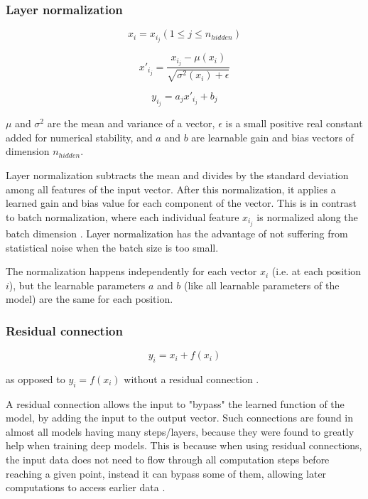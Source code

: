 \subsubsection{Layer normalization}
\label{gpt2:layernorm}


$$x_i = x_{i_j} (1 \leq j \leq n_{hidden})$$

$$x'_{i_j} = \frac {x_{i_j} - \mu(x_i)} {\sqrt {\sigma^2(x_i)+\epsilon}} $$

$$y_{i_j} = a_j x'_{i_j} + b_j$$

$\mu$ and $\sigma^2$ are the mean and variance of a vector, $\epsilon$ is a small positive real constant added for numerical stability, and $a$ and $b$ are learnable gain and bias vectors of dimension $n_{hidden}$.

Layer normalization subtracts the mean and divides by the standard deviation among all features of the input vector.
After this normalization, it applies a learned gain and bias value for each component of the vector.
This is in contrast to batch normalization, where each individual feature $x_{i_j}$ is normalized along the batch dimension .
Layer normalization has the advantage of not suffering from statistical noise when the batch size is too small.

The normalization happens independently for each vector $x_i$ (i.e. at each position $i$), but the learnable parameters $a$ and $b$ (like all learnable parameters of the model) are the same for each position.

\subsubsection{Residual connection}

\begin{samepage}

$$y_i = x_i + f(x_i)$$

as opposed to $y_i = f(x_i)$ without a residual connection  \cite{residual}.

A residual connection allows the input to "bypass" the learned function of the model, by adding the input to the output vector.
Such connections are found in almost all models having many steps/layers, because they were found to greatly help when training deep models.
This is because when using residual connections, the input data does not need to flow through all computation steps before reaching a given point, instead it can bypass some of them, allowing later computations to access earlier data .

\end{samepage}

